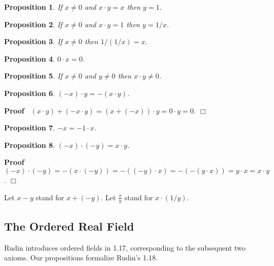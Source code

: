 \documentclass{article}
\newenvironment{forthel}{\begin{leftbar}}{\end{leftbar}}
\newenvironment{proof}{\noindent\textbf{Proof\ }}{\hspace*{\fill}$\Box$\medskip}
\newtheorem{proposition}{Proposition}
\begin{document}
\begin{forthel}
\begin{proposition} If $x \neq 0$ and $x \cdot y = x$ then $y = 1$.
\end{proposition}
\begin{proposition} If $x \neq 0$ and $x \cdot y = 1$ then $y = 1/x$.
\end{proposition}

\begin{proposition} If $x \neq 0$ then $1/(1/x) = x$.
\end{proposition}
\begin{proposition} $0 \cdot x = 0$. \end{proposition}
\begin{proposition} If $x \neq 0$ and $y \neq 0$ then $x \cdot y \neq 0$.
\end{proposition}
\begin{proposition} $(-x) \cdot y = -(x \cdot y)$. \end{proposition}
\begin{proof} $(x \cdot y) + (-x \cdot y) = (x + (-x)) \cdot y 
= 0 \cdot y = 0$.
\end{proof}

\begin{proposition} $-x = -1 \cdot x$. \end{proposition}

\begin{proposition}$(-x) \cdot (-y) = x \cdot y$.
\end{proposition}
\begin{proof} $(-x)\cdot (-y)=-(x\cdot(-y))=-((-y)\cdot x)=
-(-(y\cdot x))=y\cdot x=x\cdot y$. 
\end{proof}

Let $x - y$ stand for $x + (-y)$.
Let $\frac{x}{y}$ stand for $x \cdot (1/y)$.

\end{forthel}

\subsection{The Ordered Real Field}
Rudin introduces ordered fields in 1.17, corresponding to the subsequent two axioms. Our propositions formalize Rudin's 1.18.
\end{document}
